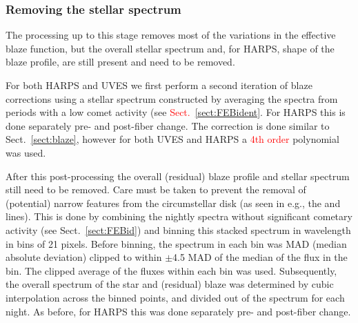\documentclass{aa}
\begin{document}
%
%
%
%

\subsubsection{Removing the stellar spectrum}\label{sect:starcor}
The processing up to this stage removes most of the variations in the effective blaze function, but the overall stellar spectrum and, for HARPS, shape of the blaze profile, are still present and need to be removed. 

For both HARPS and UVES we first perform a second iteration of blaze corrections using a  stellar spectrum constructed by averaging the spectra from periods with a low comet activity (see \textcolor{red}{Sect.~\ref{sect:FEBident}}. For HARPS this is done separately pre- and post-fiber change. The correction is done similar to Sect.~\ref{sect:blaze}, however for both UVES and HARPS a \textcolor{red}{4th order} polynomial was used.

After this post-processing the overall (residual) blaze profile and stellar spectrum still need to be removed. Care must be taken to prevent the removal of (potential) narrow features from the circumstellar disk (as seen in e.g., the  and  lines). This is done by combining the nightly spectra without significant cometary activity (see Sect.~\ref{sect:FEBid}) and binning this stacked spectrum in wavelength in bins of 21 pixels. Before binning, the spectrum in each bin was MAD (median absolute deviation) clipped to within $\pm$4.5 MAD of the median of the flux in the bin. The clipped average of the fluxes within each bin was used. Subsequently, the overall spectrum of the star and (residual) blaze was determined by cubic interpolation across the binned points, and divided out of the spectrum for each night. As before, for HARPS this was done separately pre- and post-fiber change.




%
%
\end{document}
